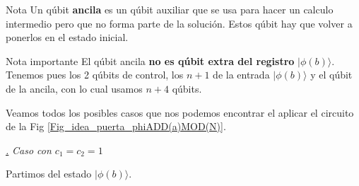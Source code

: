 \documentclass[a4paper,11pt]{book} %
\numberwithin{equation}{chapter}
\def\subsubiContadorIt{\par\addtocounter{subsubsection}{1}\underline{\it\thesubsubsection.}\hskip0.5cm \setcounter{subsubsubsectionIt}{0}}
\newcommand{\SubsubiIt}[1]{
		\subsubiContadorIt \textit{#1}
	}
\newcounter{subsubsubsectionIt}[subsubsection]
\begin{document}
\begin{mybox_blue}{Nota}
Un qúbit \textbf{ancila} es un qúbit auxiliar que se usa para hacer un calculo intermedio pero que no forma parte de la solución. Estos qúbit hay que volver a ponerlos en el estado inicial. 
\end{mybox_blue}

\begin{mybox_blue}{Nota importante}
El qúbit ancila \textbf{no es qúbit extra del registro} $| \phi (b) \rangle$. Tenemos pues los 2 qúbits de control, los $n+1$ de la entrada $| \phi (b) \rangle$ y el qúbit de la ancila, con lo cual usamos $n+4$ qúbits.
\end{mybox_blue}

Veamos todos los posibles casos que nos podemos encontrar el aplicar el circuito de la Fig \ref{Fig_idea_puerta_phiADD(a)MOD(N)}.

			\SubsubiIt{Caso con $c_1 = c_2 = 1$} 
			
Partimos del estado $| \phi(b) \rangle$.
\end{document}
